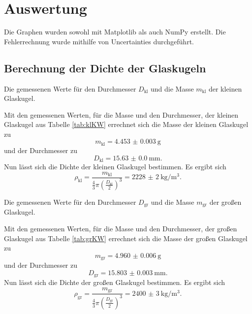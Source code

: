 \section{Auswertung}
\label{sec:Auswertung}

Die Graphen wurden sowohl mit Matplotlib \cite{matplotlib} als auch NumPy \cite{numpy} erstellt. Die
 Fehlerrechnung wurde mithilfe von Uncertainties \cite{uncertainties} durchgeführt.



\subsection{Berechnung der Dichte der Glaskugeln}
\begin{table}
	\centering
	\caption{Die gemessenen Werte für den Durchmesser $D_\text{kl}$ und die Masse $m_\text{kl}$ der kleinen Glaskugel.}
	
\end{table}
Mit den gemessenen Werten, für die Masse und den Durchmesser, der kleinen Glaskugel aus Tabelle \ref{tab:klKW} errechnet sich die Masse der kleinen Glaskugel zu
\begin{displaymath}
	m_\text{kl} = \SI{4.453(3)}{\gram}
\end{displaymath}
und der Durchmesser zu
\begin{displaymath}
	D_\text{kl} = \SI{15.63(0)}{\milli\meter}\text{.}
\end{displaymath}
Nun lässt sich die Dichte der kleinen Glaskugel bestimmen. Es ergibt sich
\begin{displaymath}
	\rho_\text{kl} = \frac{m_\text{kl}}{\frac{4}{3}\pi \left(\frac{D_\text{kl}}{2}\right)^3} = \SI{2228(2)}{\kilo\gram\per\meter\tothe{3}}\text{.}
\end{displaymath}
\begin{table}
	\centering
	\caption{Die gemessenen Werte für den Durchmesser $D_\text{gr}$ und die Masse $m_\text{gr}$ der großen Glaskugel.}
	
\end{table}
Mit den gemessenen Werten, für die Masse und den Durchmesser, der großen Glaskugel aus Tabelle \ref{tab:grKW} errechnet sich die Masse der großen Glaskugel zu
\begin{displaymath}
m_\text{gr} = \SI{4.960(6)}{\gram}
\end{displaymath}
und der Durchmesser zu
\begin{displaymath}
D_\text{gr} = \SI{15.803(3)}{\milli\meter}\text{.}
\end{displaymath}
Nun lässt sich die Dichte der großen Glaskugel bestimmen. Es ergibt sich
\begin{displaymath}
\rho_\text{gr} = \frac{m_\text{gr}}{\frac{4}{3}\pi \left(\frac{D_\text{gr}}{2}\right)^3} = \SI{2400(3)}{\kilo\gram\per\meter\tothe{3}}\text{.}
\end{displaymath}



